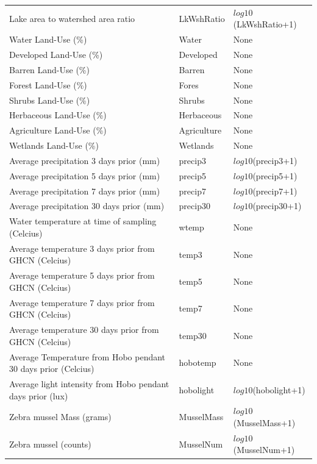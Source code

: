 \begin{center}
\begin{longtable}{p{3.5cm}p{1cm}p{3.3cm}}
Lake area to watershed area ratio & LkWshRatio &  $log10$(LkWshRatio+1) \\
Water Land-Use (\%) & Water &  None \\
Developed Land-Use  (\%) & Developed & None \\
Barren Land-Use (\%) & Barren & None \\
Forest Land-Use (\%) & Fores & None \\
Shrubs Land-Use (\%) & Shrubs & None \\
Herbaceous Land-Use (\%) & Herbaceous  & None \\
Agriculture Land-Use (\%) & Agriculture & None \\
Wetlands Land-Use (\%) & Wetlands & None \\
Average precipitation 3 days prior (mm) & precip3 &  $log10$(precip3+1) \\
Average precipitation 5 days prior (mm)  & precip5 & $log10$(precip5+1) \\
Average precipitation 7 days prior (mm) & precip7 &  $log10$(precip7+1) \\
Average precipitation 30 days prior (mm) & precip30 &  $log10$(precip30+1) \\
Water temperature at time of sampling (Celcius) & wtemp & None \\
Average temperature 3 days prior from GHCN (Celcius) & temp3&  None \\
Average temperature 5 days prior from GHCN (Celcius) & temp5 & None \\
Average temperature 7 days prior  from GHCN (Celcius) &  temp7 & None \\
Average temperature 30 days prior from GHCN (Celcius) & temp30 &  None \\
Average Temperature from Hobo pendant 30 days prior (Celcius) & hobotemp & None \\
Average light intensity from Hobo pendant days prior (lux) & hobolight & $log10$(hobolight+1) \\
Zebra mussel Mass (grams) & MusselMass &  $log10$(MusselMass+1) \\
Zebra mussel (counts) &  MusselNum & $log10$(MusselNum+1) \\
\hline
\end{longtable}
\end{center}

